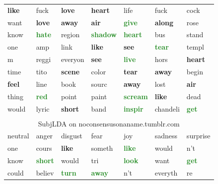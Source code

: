 \documentclass{article}
\begin{document}
\begin{table}
\begin{tabular}{ l l l l l l l  }
    \textcolor{BrickRed}{\textbf{like}} & fuck & \textcolor{BrickRed}{\textbf{love}} & \textcolor{BrickRed}{\textbf{heart}} & life & fuck & cock \\
    want & \textcolor{BrickRed}{\textbf{love}} & \textcolor{BrickRed}{\textbf{away}} & \textcolor{BrickRed}{\textbf{air}} & \textcolor{ForestGreen}{\textbf{give}} & \textcolor{BrickRed}{\textbf{along}} & rose \\
    know & \textcolor{ForestGreen}{\textbf{hate}} & region & \textcolor{ForestGreen}{\textbf{shadow}} & \textcolor{ForestGreen}{\textbf{heart}} & bus & stand \\
    one & amp & link & \textcolor{BrickRed}{\textbf{like}} & \textcolor{BrickRed}{\textbf{see}} & \textcolor{ForestGreen}{\textbf{tear}} & templ \\
    m & reggi & everyon & \textcolor{BrickRed}{\textbf{see}} & \textcolor{ForestGreen}{\textbf{live}} & hors & \textcolor{BrickRed}{\textbf{heart}} \\
    time & tito & \textcolor{BrickRed}{\textbf{scene}} & color & \textcolor{BrickRed}{\textbf{tear}} & \textcolor{BrickRed}{\textbf{away}} & begin \\
    \textcolor{BrickRed}{\textbf{feel}} & line & book & sourc & \textcolor{BrickRed}{\textbf{away}} & lost & \textcolor{BrickRed}{\textbf{air}} \\
    thing & \textcolor{ForestGreen}{\textbf{red}} & point & paint & \textcolor{ForestGreen}{\textbf{scream}} & \textcolor{BrickRed}{\textbf{like}} & dead \\
    would & lyric & \textcolor{BrickRed}{\textbf{short}} & band & \textcolor{ForestGreen}{\textbf{inspir}} & chandeli & \textcolor{ForestGreen}{\textbf{get}} \\
\multicolumn{7}{c}{ } \\
\multicolumn{7}{c}{ \sc SubjLDA on noconsensusonaname.tumblr.com }\\
\sc neutral & \sc anger & \sc disgust & \sc fear & \sc joy & \sc sadness & \sc surprise \\
\hline
one & cours & \textcolor{BrickRed}{\textbf{like}} & someth & \textcolor{ForestGreen}{\textbf{like}} & would & n't \\
know & \textcolor{ForestGreen}{\textbf{short}} & would & tri & \textcolor{ForestGreen}{\textbf{look}} & want & \textcolor{ForestGreen}{\textbf{get}} \\
could & believ & \textcolor{ForestGreen}{\textbf{turn}} & \textcolor{ForestGreen}{\textbf{away}} & n't & everyth & re \\

\end{tabular}
\end{table}
\end{document}
